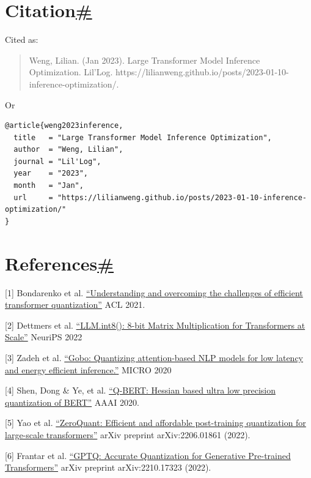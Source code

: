 \section{\texorpdfstring{Citation\hyperref[citation]{\#}}{Citation\#}}\label{citation}

Cited as:

\begin{quote}
Weng, Lilian. (Jan 2023). Large Transformer Model Inference Optimization. Lil'Log. https://lilianweng.github.io/posts/2023-01-10-inference-optimization/.
\end{quote}

Or

\begin{verbatim}
@article{weng2023inference,
  title   = "Large Transformer Model Inference Optimization",
  author  = "Weng, Lilian",
  journal = "Lil'Log",
  year    = "2023",
  month   = "Jan",
  url     = "https://lilianweng.github.io/posts/2023-01-10-inference-optimization/"
}
\end{verbatim}

\section{\texorpdfstring{References\hyperref[references]{\#}}{References\#}}\label{references}

{[}1{]} Bondarenko et al. \href{https://arxiv.org/abs/2109.12948}{``Understanding and overcoming the challenges of efficient transformer quantization''} ACL 2021.

{[}2{]} Dettmers et al. \href{https://arxiv.org/abs/2208.07339}{``LLM.int8(): 8-bit Matrix Multiplication for Transformers at Scale''} NeuriPS 2022

{[}3{]} Zadeh et al. \href{https://arxiv.org/abs/2005.03842}{``Gobo: Quantizing attention-based NLP models for low latency and energy efficient inference.''} MICRO 2020

{[}4{]} Shen, Dong \& Ye, et al. \href{https://arxiv.org/abs/1909.05840}{``Q-BERT: Hessian based ultra low precision quantization of BERT''} AAAI 2020.

{[}5{]} Yao et al. \href{https://arxiv.org/abs/2206.01861}{``ZeroQuant: Efficient and affordable post-training quantization for large-scale transformers''} arXiv preprint arXiv:2206.01861 (2022).

{[}6{]} Frantar et al. \href{https://arxiv.org/abs/2210.17323}{``GPTQ: Accurate Quantization for Generative Pre-trained Transformers''} arXiv preprint arXiv:2210.17323 (2022).

